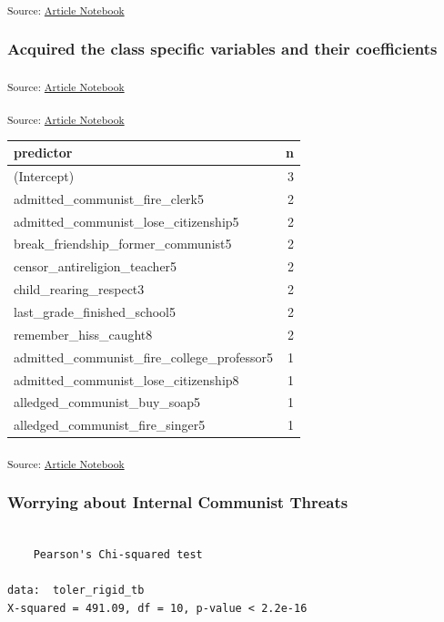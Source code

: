 \documentclass[
  letterpaper,
  DIV=11,
  numbers=noendperiod]{scrartcl}
\begin{document}
\textsubscript{Source:
\href{https://h-christy.github.io/data-ethics-final/index.qmd.html}{Article
Notebook}}

\subsubsection{Acquired the class specific variables and their
coefficients}\label{acquired-the-class-specific-variables-and-their-coefficients}

\textsubscript{Source:
\href{https://h-christy.github.io/data-ethics-final/index.qmd.html}{Article
Notebook}}

\textsubscript{Source:
\href{https://h-christy.github.io/data-ethics-final/index.qmd.html}{Article
Notebook}}

\begin{longtable}[]{@{}lr@{}}
\toprule\noalign{}
predictor & n \\
\midrule\noalign{}
\endhead
\bottomrule\noalign{}
\endlastfoot
(Intercept) & 3 \\
admitted\_communist\_fire\_clerk5 & 2 \\
admitted\_communist\_lose\_citizenship5 & 2 \\
break\_friendship\_former\_communist5 & 2 \\
censor\_antireligion\_teacher5 & 2 \\
child\_rearing\_respect3 & 2 \\
last\_grade\_finished\_school5 & 2 \\
remember\_hiss\_caught8 & 2 \\
admitted\_communist\_fire\_college\_professor5 & 1 \\
admitted\_communist\_lose\_citizenship8 & 1 \\
alledged\_communist\_buy\_soap5 & 1 \\
alledged\_communist\_fire\_singer5 & 1 \\
\end{longtable}

\textsubscript{Source:
\href{https://h-christy.github.io/data-ethics-final/index.qmd.html}{Article
Notebook}}

\subsubsection{Worrying about Internal Communist
Threats}\label{worrying-about-internal-communist-threats}

\begin{verbatim}

    Pearson's Chi-squared test

data:  toler_rigid_tb
X-squared = 491.09, df = 10, p-value < 2.2e-16
\end{verbatim}
\end{document}
